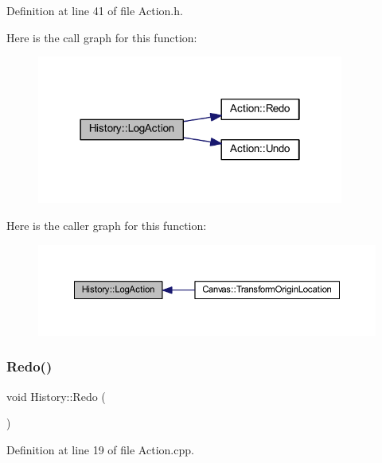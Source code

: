 Definition at line 41 of file Action.\+h.

Here is the call graph for this function\+:
\nopagebreak
\begin{figure}[H]
\begin{center}
\leavevmode
\includegraphics[width=286pt]{class_history_ae2286b5c19bc1a5947caf33bdc5a39b0_cgraph}
\end{center}
\end{figure}
Here is the caller graph for this function\+:
\nopagebreak
\begin{figure}[H]
\begin{center}
\leavevmode
\includegraphics[width=350pt]{class_history_ae2286b5c19bc1a5947caf33bdc5a39b0_icgraph}
\end{center}
\end{figure}
\mbox{\label{class_history_abc639588fdca61df2902377e08a64dd6}} 
\subsubsection{\texorpdfstring{Redo()}{Redo()}}
{\footnotesize\ttfamily void History\+::\+Redo (\begin{DoxyParamCaption}{ }\end{DoxyParamCaption})}



Definition at line 19 of file Action.\+cpp.

